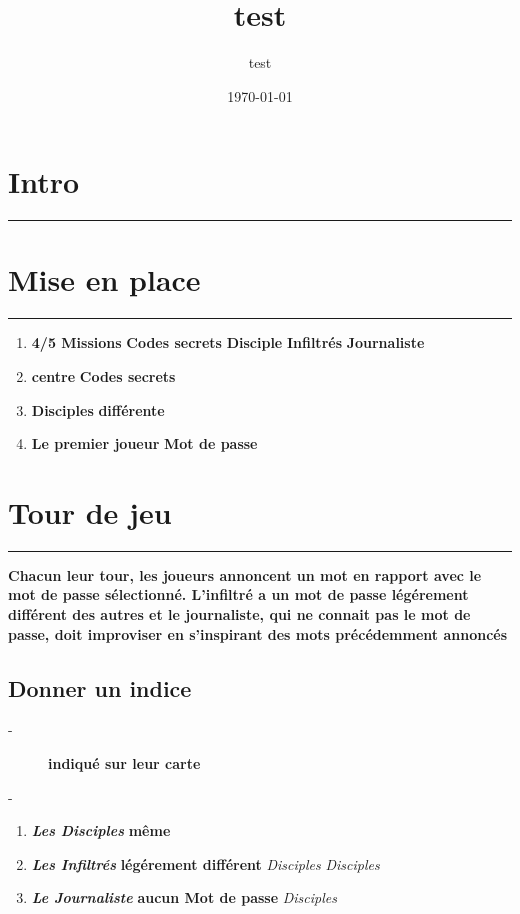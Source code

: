 \documentclass{article}%
\title{test}%
\author{test}%
\date{\today}%
\begin{document}
%
\normalsize%
\maketitle\thispagestyle{header}%
\pagestyle{header}%
\section{ Intro
}%
\label{sec:Intro}%
\rule{18cm}{0.07cm}\break

%
\section{ Mise en place
}%
\label{sec:Miseenplace}%
\rule{18cm}{0.07cm}\break%
\begin{enumerate}%
\item%
%
\textbf{4/5 Missions}%
\textbf{Codes secrets}%
\textit{ }%
\textbf{Disciple}%
\textbf{ Infiltrés}%
\textit{ }%
\textbf{Journaliste}%
\textit{ }%
\item%
%
\textbf{centre}%
\textit{ }%
\textbf{Codes secrets}%
\item%
%
\textbf{Disciples}%
\textit{ }%
\textbf{différente}%
\item%
%
\textbf{Le premier joueur}%
\textit{ }%
\textbf{Mot de passe}%
\textit{ }%
\end{enumerate}

%
\section{ Tour de jeu
}%
\label{sec:Tourdejeu}%
\rule{18cm}{0.07cm}\break%
\textbf{Chacun leur tour, les joueurs annoncent un mot en rapport avec le mot de passe sélectionné. L'infiltré a un mot de passe légérement différent des autres et le journaliste, qui ne connait pas le mot de passe, doit improviser en s'inspirant des mots précédemment annoncés}

%
\subsection{ Donner un indice
}%
\label{subsec:Donnerunindice}%
\begin{description}%
\item[{-} ]%
%
\textbf{indiqué sur leur carte}%
\item[{-} ]%
%
\end{description}%
\begin{enumerate}%
\item%
%
\textbf{\textit{Les Disciples}}%
\textit{ }%
\textbf{même}%
\textit{ }%
\item%
%
\textbf{\textit{Les Infiltrés}}%
\textit{ }%
\textbf{légérement différent}%
\textit{ }%
\textit{Disciples}%
\textit{Disciples}%
\item%
%
\textbf{\textit{Le Journaliste}}%
\textit{ }%
\textbf{aucun Mot de passe}%
\textit{Disciples}%
\end{enumerate}
\end{document}
